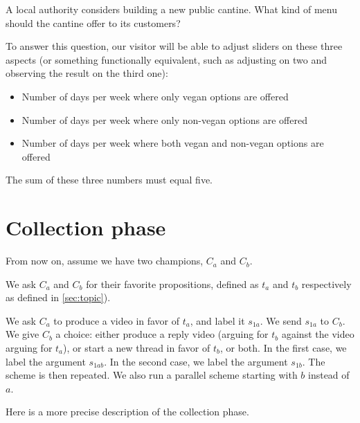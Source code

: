 \documentclass[version=3.21, pagesize, twoside=off, bibliography=totoc, DIV=calc, fontsize=12pt, a4paper]{scrartcl}
\begin{document}
A local authority considers building a new public cantine. What kind of menu should the cantine offer to its customers?

To answer this question, our visitor will be able to adjust sliders on these three aspects (or something functionally equivalent, such as adjusting on two and observing the result on the third one):
\begin{itemize}
	\item Number of days per week where only vegan options are offered
	\item Number of days per week where only non-vegan options are offered 
	\item Number of days per week where both vegan and non-vegan options are offered
\end{itemize}
The sum of these three numbers must equal five.

\section{Collection phase}
From now on, assume we have two champions, $C_a$ and $C_b$.

We ask $C_a$ and $C_b$ for their favorite propositions, defined as $t_a$ and $t_b$ respectively as defined in \cref{sec:topic}). 

We ask $C_a$ to produce a video in favor of $t_a$, and label it $s_{1a}$. We send $s_{1a}$ to $C_b$. We give $C_b$ a choice: either produce a reply video (arguing for $t_b$ against the video arguing for $t_a$), or start a new thread in favor of $t_b$, or both. In the first case, we label the argument $s_{1ab}$. In the second case, we label the argument $s_{1b}$. The scheme is then repeated. We also run a parallel scheme starting with $b$ instead of $a$.

Here is a more precise description of the collection phase.
\end{document}

